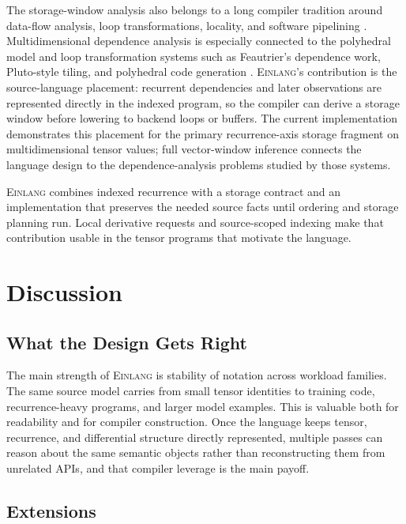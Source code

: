 \documentclass[sigplan,screen,nonacm]{acmart}
\newcommand{\einlang}{\textsc{Einlang}}
\begin{document}
The storage-window analysis also belongs to a long compiler tradition around data-flow analysis, loop transformations, locality, and software pipelining \cite{allen2001optimizing,muchnick1997advanced,lam1988software,rau1994iterative}. Multidimensional dependence analysis is especially connected to the polyhedral model and loop transformation systems such as Feautrier's dependence work, Pluto-style tiling, and polyhedral code generation \cite{feautrier1991data,bondhugula2008pluto,bastoul2004code}. \einlang{}'s contribution is the source-language placement: recurrent dependencies and later observations are represented directly in the indexed program, so the compiler can derive a storage window before lowering to backend loops or buffers. The current implementation demonstrates this placement for the primary recurrence-axis storage fragment on multidimensional tensor values; full vector-window inference connects the language design to the dependence-analysis problems studied by those systems.

\einlang{} combines indexed recurrence with a storage contract and an implementation that preserves the needed source facts until ordering and storage planning run. Local derivative requests and source-scoped indexing make that contribution usable in the tensor programs that motivate the language.

\section{Discussion}

\subsection{What the Design Gets Right}

The main strength of \einlang{} is stability of notation across workload families. The same source model carries from small tensor identities to training code, recurrence-heavy programs, and larger model examples. This is valuable both for readability and for compiler construction. Once the language keeps tensor, recurrence, and differential structure directly represented, multiple passes can reason about the same semantic objects rather than reconstructing them from unrelated APIs, and that compiler leverage is the main payoff.

\subsection{Extensions}
\end{document}
